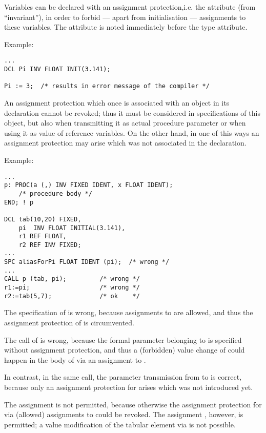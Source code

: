Variables can be declared with an assignment protection,i.e. the attribute
 (from ``invariant''), in order to forbid --- apart from
initialisation --- assignments to these variables. The attribute  is
noted immediately before the type attribute.

Example:

\begin{lstlisting}
...
DCL Pi INV FLOAT INIT(3.141);

Pi := 3;  /* results in error message of the compiler */
\end{lstlisting}

An assignment protection which once is associated with an object in its
declaration cannot be revoked; thus it must be considered in
specifications of this object, but also when transmitting it as actual
procedure parameter or when using it as value of reference variables. On
the other hand, in one of this ways an assignment protection may arise
which was not associated in the declaration.

Example:

\begin{lstlisting}
...
p: PROC(a (,) INV FIXED IDENT, x FLOAT IDENT);
    /* procedure body */
END; ! p
 
DCL tab(10,20) FIXED,
    pi  INV FLOAT INITIAL(3.141),
    r1 REF FLOAT,
    r2 REF INV FIXED;
... 
SPC aliasForPi FLOAT IDENT (pi);  /* wrong */ 
... 
CALL p (tab, pi);         /* wrong */ 
r1:=pi;                   /* wrong */
r2:=tab(5,7);             /* ok    */
\end{lstlisting}

The specification of  is wrong, because assignments to
  are allowed,
and thus the assignment protection of  is circumvented.

The call of  is wrong, because the formal parameter  
belonging to 
is specified without assignment protection, and thus a (forbidden) value
change of  could happen in the body of  
via an assignment to .

In contrast, in the same call, the parameter transmission from 
 to 
is correct, because only an assignment protection for  arises which
was not introduced yet.

The assignment  is not permitted, because otherwise the assignment
protection for  via (allowed) assignments to 
 could be revoked.
The assignment , however, is permitted; a value modification
of the tabular element via  is not possible.

